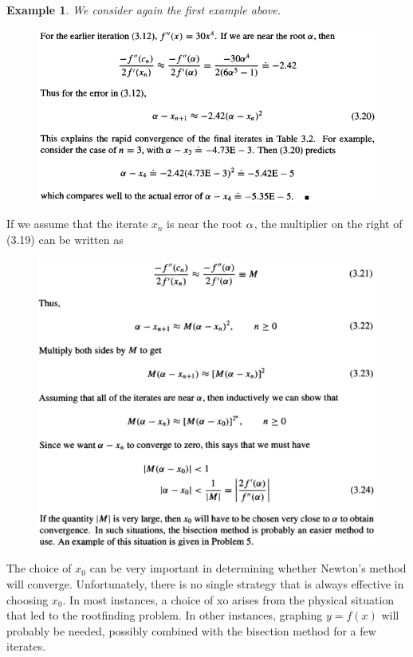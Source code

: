 \documentclass[12pt]{article}
\theoremstyle{theorem}
\newtheorem{exa}{Example}
\begin{document}
\newpage 
%
\begin{exa}
We consider again the first example above.
%
\begin{figure}[h!]
	\centering
	\includegraphics[scale=0.8]{Figures/6}
\end{figure}
\end{exa}
%
If we assume that the iterate $x_n$ is near the root $\alpha$, the multiplier on the right of (3.19) can be written as 
\begin{figure}[h!]
	\centering
	\includegraphics[scale=0.85]{Figures/7}
\end{figure}

\begin{shaded}
The choice of $x_0$ can be very important in determining whether Newton’s method will converge. Unfortunately, there is no single strategy that is always effective in choosing $x_0$. In most instances, a choice of xo arises from the physical situation that led to the rootfinding problem. In other instances, graphing $y=f(x)$ will probably be needed, possibly combined with the bisection method for a few iterates. 
\end{shaded}
\end{document}
